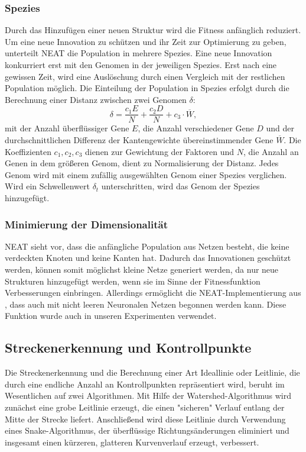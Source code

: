 \documentclass[11pt,final,journal,a4paper,towside,towcolumn]{IEEEtran}
\begin{document}
\subsubsection*{Spezies}
Durch das Hinzufügen einer neuen Struktur wird die Fitness anfänglich reduziert. Um eine neue Innovation zu schützen und ihr Zeit zur Optimierung zu geben, unterteilt \ac{NEAT} die Population in mehrere Spezies. Eine neue Innovation konkurriert erst mit den Genomen in der jeweiligen Spezies. Erst nach eine gewissen Zeit, wird eine Auslöschung durch einen Vergleich mit der restlichen Population möglich. Die Einteilung der Population in Spezies erfolgt durch die Berechnung einer Distanz zwischen zwei Genomen $\delta$:
\begin{equation}
\delta=\frac{c_1E}{N} + \frac{c_2D}{N} + c_3\cdot \overline{W},
\end{equation}
mit der Anzahl überflüssiger Gene $E$, die Anzahl verschiedener Gene $D$ und der durchschnittlichen Differenz der Kantengewichte übereinstimmender Gene $\overline{W}$. Die Koeffizienten $c_1, c_2, c_3$ dienen zur Gewichtung der Faktoren und $N$, die Anzahl an Genen in dem größeren Genom, dient zu Normalisierung der Distanz. Jedes Genom wird mit einem zufällig ausgewählten Genom einer Spezies verglichen. Wird ein Schwellenwert $\delta_t$ unterschritten, wird das Genom der Spezies hinzugefügt.

\subsubsection*{Minimierung der Dimensionalität}
\ac{NEAT} sieht vor, dass die anfängliche Population aus Netzen besteht, die keine verdeckten Knoten und keine Kanten hat. Dadurch das Innovationen geschützt werden, können somit möglichst kleine Netze generiert werden, da nur neue Strukturen hinzugefügt werden, wenn sie im Sinne der Fitnessfunktion Verbesserungen einbringen.
Allerdings ermöglicht die \ac{NEAT}-Implementierung aus \cite{python-neat}, dass auch mit nicht leeren Neuronalen Netzen begonnen werden kann. Diese Funktion wurde auch in unseren Experimenten verwendet.

\subsection{Streckenerkennung und Kontrollpunkte}
Die Streckenerkennung und die Berechnung einer Art Ideallinie oder Leitlinie, die durch eine endliche Anzahl an Kontrollpunkten repräsentiert wird, beruht im Wesentlichen auf zwei Algorithmen. Mit Hilfe der Watershed-Algorithmus wird zunächst eine grobe Leitlinie erzeugt, die einen "sicheren" Verlauf entlang der Mitte der Strecke liefert. Anschließend wird diese Leitlinie durch Verwendung eines Snake-Algorithmus, der überflüssige Richtungsänderungen eliminiert und insgesamt einen kürzeren, glatteren Kurvenverlauf erzeugt, verbessert.
\end{document}
